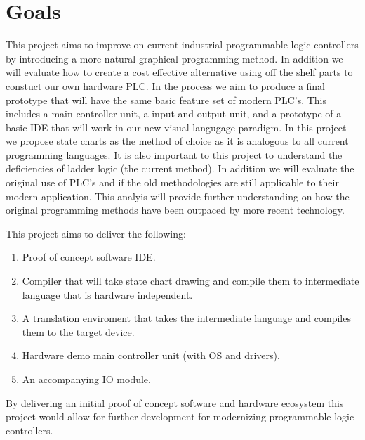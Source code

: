 \section{Goals}

This project aims to improve on current industrial programmable logic controllers by introducing a more natural graphical programming method. In addition we will evaluate how to create a cost effective alternative using off the shelf parts to constuct our own hardware PLC. In the process we aim to produce a final prototype that will have the same basic feature set of modern PLC's. This includes a main controller unit, a input and output unit, and a prototype of a basic IDE that will work in our new visual langugage paradigm. In this project we propose state charts as the method of choice as it is analogous to all current programming languages. It is also important to this project to understand the deficiencies of ladder logic (the current method). In addition we will evaluate the original use of PLC's and if the old methodologies are still applicable to their modern application. This analyis will provide further understanding on how the original programming methods have been outpaced by more recent technology.

This project aims to deliver the following:
\begin{enumerate}
\item Proof of concept software IDE.
\item Compiler that will take state chart drawing and compile them to intermediate language that is hardware independent.
\item A translation enviroment that takes the intermediate language and compiles them to the target device. 
\item Hardware demo main controller unit (with OS and drivers).
\item An accompanying IO module. %
\end{enumerate}
By delivering an initial proof of concept software and hardware ecosystem this project would allow for further development for modernizing programmable logic controllers.

